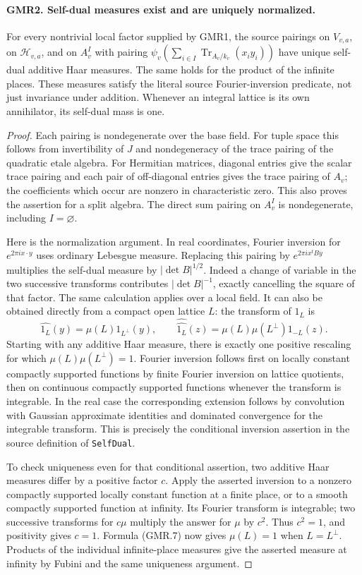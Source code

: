 \documentclass[11pt,a4paper]{article}
\numberwithin{equation}{section}
\theoremstyle{remark}\newtheorem{remark}[theorem]{Remark}
\begin{document}
\paragraph{GMR2. Self-dual measures exist and are uniquely normalized.}
\label{claim:GMR2}
For every nontrivial local factor supplied by GMR1, the source pairings
on $V_{v,a}$, on $\mathcal H_{v,a}$, and on $A_v^I$ with pairing
$\psi_v(\sum_{i\in I}\operatorname{Tr}_{A_v/k_v}(x_i y_i))$
have unique self-dual additive Haar measures.  The same holds for the
product of the infinite places.  These measures satisfy the literal
source Fourier-inversion predicate, not just invariance under addition.
Whenever an integral lattice is its own annihilator, its self-dual mass
is one.

\begin{proof}
Each pairing is nondegenerate over the base field.  For tuple space
this follows from invertibility of $J$ and nondegeneracy of the trace
pairing of the quadratic etale algebra.  For Hermitian matrices,
diagonal entries give the scalar trace pairing and each pair of
off-diagonal entries gives the trace pairing of $A_v$; the coefficients
which occur are nonzero in characteristic zero.  This also proves the
assertion for a split algebra.  The direct sum pairing on $A_v^I$ is
nondegenerate, including $I=\varnothing$.

Here is the normalization argument.  In real coordinates, Fourier
inversion for $e^{2\pi i x\cdot y}$ uses ordinary Lebesgue measure.
Replacing this pairing by $e^{2\pi i x^tBy}$ multiplies the self-dual
measure by $|\det B|^{1/2}$.  Indeed a change of variable in the two
successive transforms contributes $|\det B|^{-1}$, exactly cancelling
the square of that factor.  The same calculation applies over a local
field.  It can also be obtained directly from a compact open lattice
$L$: the transform of $1_L$ is
\[
 \widehat{1_L}(y)=\mu(L)1_{L^\perp}(y),\qquad
 \widehat{\widehat{1_L}}(z)=\mu(L)\mu(L^\perp)1_{-L}(z).
 \tag{GMR.7}
\]
Starting with any additive Haar measure, there is exactly one positive
rescaling for which $\mu(L)\mu(L^\perp)=1$.  Fourier inversion follows
first on locally constant compactly supported functions by finite
Fourier inversion on lattice quotients, then on continuous compactly
supported functions whenever the transform is integrable.  In the real
case the corresponding extension follows by convolution with Gaussian
approximate identities and dominated convergence for the integrable
transform.  This is precisely the conditional inversion assertion in
the source definition of \texttt{Self\allowbreak Dual}.

To check uniqueness even for that conditional assertion, two additive
Haar measures differ by a positive factor $c$.  Apply the asserted
inversion to a nonzero compactly supported locally constant function
at a finite place, or to a smooth compactly supported function at
infinity.  Its Fourier transform is integrable; two successive
transforms for $c\mu$ multiply the answer for $\mu$ by $c^2$.
Thus $c^2=1$, and positivity gives $c=1$.  Formula (GMR.7) now gives
$\mu(L)=1$ when $L=L^\perp$.  Products of the individual infinite-place
measures give the asserted measure at infinity by Fubini and the same
uniqueness argument.
\end{proof}
\end{document}
